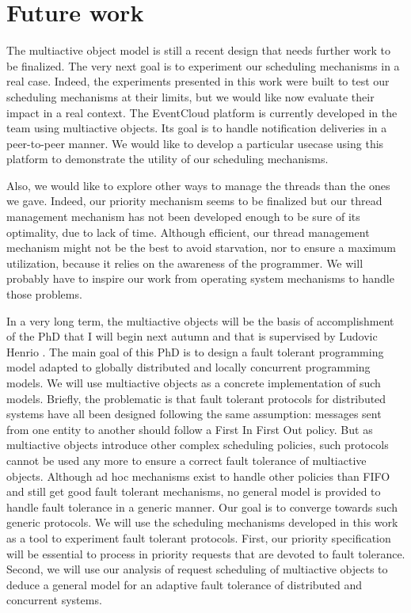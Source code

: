 \documentclass[11pt]{report}
\begin{document}
\section{Future work}
The multiactive object model is still a recent design that needs further work to be finalized. The very next goal is to experiment our scheduling mechanisms in a real case. Indeed, the experiments presented in this work were built to test our scheduling mechanisms at their limits, but we would like now evaluate their impact in a real context. The EventCloud platform \cite{ref:eventcloud} is currently developed in the team using multiactive objects. Its goal is to handle notification deliveries in a peer-to-peer manner. We would like to develop a particular usecase using this platform to demonstrate the utility of our scheduling mechanisms. 

Also, we would like to explore other ways to manage the threads than the ones we gave. Indeed, our priority mechanism seems to be finalized but our thread management mechanism has not been developed enough to be sure of its optimality, due to lack of time. Although efficient, our thread management mechanism might not be the best to avoid starvation, nor to ensure a maximum utilization, because it relies on the awareness of the programmer. We will probably have to inspire our work from operating system mechanisms to handle those problems.

In a very long term, the multiactive objects will be the basis of  accomplishment of the PhD that I will begin next autumn and that is supervised by Ludovic Henrio \cite{ref:these}. The main goal of this PhD is to design a fault tolerant programming model adapted to globally distributed and locally concurrent programming models. We will use multiactive objects as a concrete implementation of such models. Briefly, the problematic is that fault tolerant protocols for distributed systems have all been designed following the same assumption: messages sent from one entity to another should follow a First In First Out policy. But as multiactive objects introduce other complex scheduling policies, such protocols cannot be used any more to ensure a correct fault tolerance of multiactive objects. Although ad hoc mechanisms exist to handle other policies than FIFO and still get good fault tolerant mechanisms, no general model is provided to handle fault tolerance in a generic manner. Our goal is to converge towards such generic protocols. We will use the scheduling mechanisms developed in this work as a tool to experiment fault tolerant protocols. First, our priority specification will be essential to process in priority requests that are devoted to fault tolerance. Second, we will use our analysis of request scheduling of multiactive objects to deduce a general model for an adaptive fault tolerance of distributed and concurrent systems.
\end{document}
